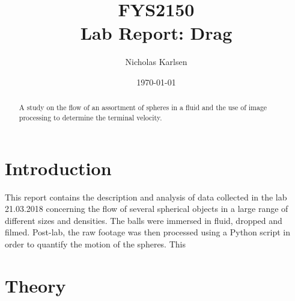 \documentclass[11pt,a4paper]{article}
\begin{document}

\title{FYS2150 \\ Lab Report: Drag}%

\author{Nicholas Karlsen}

\date{\today}%

\maketitle

\begin{abstract}
  A study on the flow of an assortment of spheres in a fluid and the use of image processing to determine the terminal velocity.
\end{abstract}


\section{\label{sect:intro}Introduction}
  This report contains the description and analysis of data collected in the lab 21.03.2018 concerning the flow of several spherical objects in a large range of different sizes and densities. The balls were immersed in fluid, dropped and filmed. Post-lab, the raw footage was then processed using a Python script in order to quantify the motion of the spheres. This 

\section{\label{sect:theory}Theory}
\end{document}
